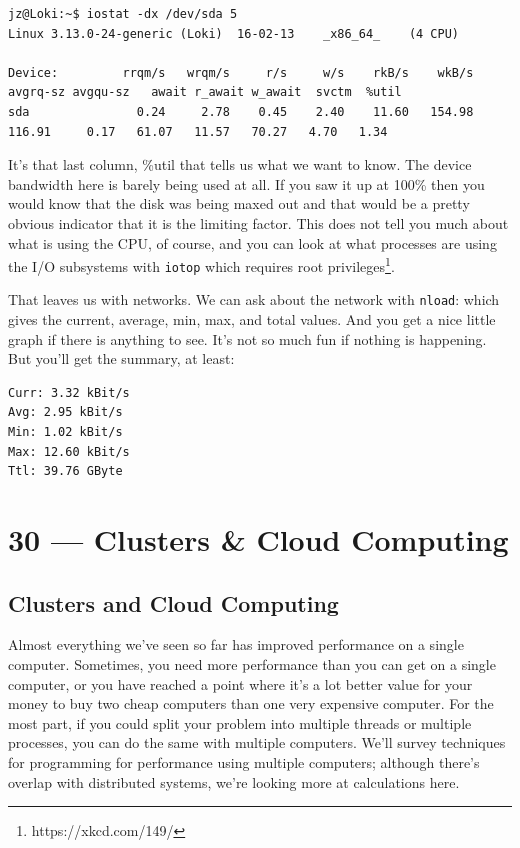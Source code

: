 \documentclass[a4paper]{report}
\begin{document}
{\scriptsize
\begin{verbatim}
jz@Loki:~$ iostat -dx /dev/sda 5 
Linux 3.13.0-24-generic (Loki) 	16-02-13 	_x86_64_	(4 CPU)

Device:         rrqm/s   wrqm/s     r/s     w/s    rkB/s    wkB/s avgrq-sz avgqu-sz   await r_await w_await  svctm  %util
sda               0.24     2.78    0.45    2.40    11.60   154.98   116.91     0.17   61.07   11.57   70.27   4.70   1.34
\end{verbatim}
}

It's that last column, \%util that tells us what we want to know. The device bandwidth here is barely being used at all. If you saw it up at 100\% then you would know that the disk was being maxed out and that would be a pretty obvious indicator that it is the limiting factor. This does not tell you much about what is using the CPU, of course, and you can look at what processes are using the I/O subsystems with \texttt{iotop} which requires root privileges\footnote{https://xkcd.com/149/}.

That leaves us with networks. We can ask about the network with \texttt{nload}: which gives the current, average, min, max, and total values. And you get a nice little graph if there is anything to see. It's not so much fun if nothing is happening. But you'll get the summary, at least:

\begin{verbatim}
Curr: 3.32 kBit/s
Avg: 2.95 kBit/s
Min: 1.02 kBit/s
Max: 12.60 kBit/s
Ttl: 39.76 GByte                                                                                       \end{verbatim}









\chapter*{30 --- Clusters \& Cloud Computing}


\section*{Clusters and Cloud Computing}
Almost everything we've seen so far has improved performance on a single
computer. Sometimes, you need more performance than you can get on a
single computer, or you have reached a point where it's a lot better value for
your money to buy two cheap computers than one very expensive computer.
For the most part, if you could split your problem into
multiple threads or multiple processes, you can do the same with multiple
computers. We'll survey techniques for programming for
performance using multiple computers; although there's overlap with
distributed systems, we're looking more at calculations here.
\end{document}
